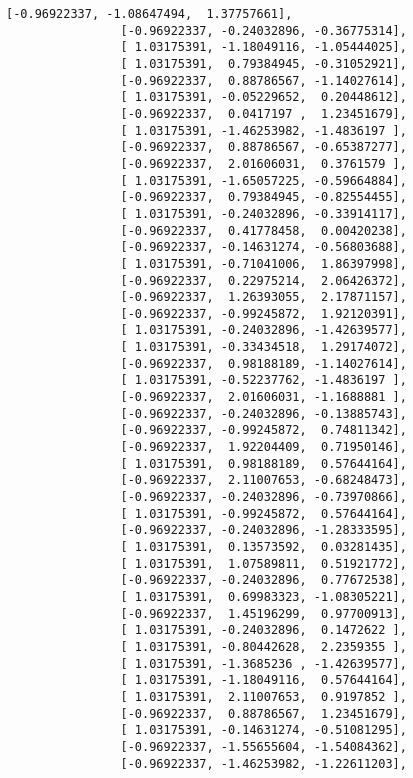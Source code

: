 \documentclass[11pt]{article}
\begin{document}
\begin{Verbatim}[commandchars=\\\{\}]
                [-0.96922337, -1.08647494,  1.37757661],
                [-0.96922337, -0.24032896, -0.36775314],
                [ 1.03175391, -1.18049116, -1.05444025],
                [ 1.03175391,  0.79384945, -0.31052921],
                [-0.96922337,  0.88786567, -1.14027614],
                [ 1.03175391, -0.05229652,  0.20448612],
                [-0.96922337,  0.0417197 ,  1.23451679],
                [ 1.03175391, -1.46253982, -1.4836197 ],
                [-0.96922337,  0.88786567, -0.65387277],
                [-0.96922337,  2.01606031,  0.3761579 ],
                [ 1.03175391, -1.65057225, -0.59664884],
                [-0.96922337,  0.79384945, -0.82554455],
                [ 1.03175391, -0.24032896, -0.33914117],
                [-0.96922337,  0.41778458,  0.00420238],
                [-0.96922337, -0.14631274, -0.56803688],
                [ 1.03175391, -0.71041006,  1.86397998],
                [-0.96922337,  0.22975214,  2.06426372],
                [-0.96922337,  1.26393055,  2.17871157],
                [-0.96922337, -0.99245872,  1.92120391],
                [ 1.03175391, -0.24032896, -1.42639577],
                [ 1.03175391, -0.33434518,  1.29174072],
                [-0.96922337,  0.98188189, -1.14027614],
                [ 1.03175391, -0.52237762, -1.4836197 ],
                [-0.96922337,  2.01606031, -1.1688881 ],
                [-0.96922337, -0.24032896, -0.13885743],
                [-0.96922337, -0.99245872,  0.74811342],
                [-0.96922337,  1.92204409,  0.71950146],
                [ 1.03175391,  0.98188189,  0.57644164],
                [-0.96922337,  2.11007653, -0.68248473],
                [-0.96922337, -0.24032896, -0.73970866],
                [ 1.03175391, -0.99245872,  0.57644164],
                [-0.96922337, -0.24032896, -1.28333595],
                [ 1.03175391,  0.13573592,  0.03281435],
                [ 1.03175391,  1.07589811,  0.51921772],
                [-0.96922337, -0.24032896,  0.77672538],
                [ 1.03175391,  0.69983323, -1.08305221],
                [-0.96922337,  1.45196299,  0.97700913],
                [ 1.03175391, -0.24032896,  0.1472622 ],
                [ 1.03175391, -0.80442628,  2.2359355 ],
                [ 1.03175391, -1.3685236 , -1.42639577],
                [ 1.03175391, -1.18049116,  0.57644164],
                [ 1.03175391,  2.11007653,  0.9197852 ],
                [-0.96922337,  0.88786567,  1.23451679],
                [ 1.03175391, -0.14631274, -0.51081295],
                [-0.96922337, -1.55655604, -1.54084362],
                [-0.96922337, -1.46253982, -1.22611203],

\end{Verbatim}
\end{document}
